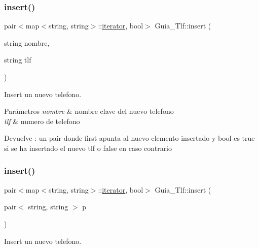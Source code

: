\subsubsection{\texorpdfstring{insert()}{insert()}\hspace{0.1cm}{\footnotesize\ttfamily [1/2]}}
{\footnotesize\ttfamily pair$<$map$<$string, string$>$\+::\hyperlink{classGuia__Tlf_1_1iterator}{iterator}, bool$>$ Guia\+\_\+\+Tlf\+::insert (\begin{DoxyParamCaption}\item[{string}]{nombre,  }\item[{string}]{tlf }\end{DoxyParamCaption})\hspace{0.3cm}{\ttfamily [inline]}}



Insert un nuevo telefono. 


\begin{DoxyParams}{Parámetros}
{\em nombre} & nombre clave del nuevo telefono \\
\hline
{\em tlf} & numero de telefono \\
\hline
\end{DoxyParams}
\begin{DoxyReturn}{Devuelve}
\+: un pair donde first apunta al nuevo elemento insertado y bool es true si se ha insertado el nuevo tlf o false en caso contrario 
\end{DoxyReturn}
\mbox{\label{classGuia__Tlf_a773d474972ea06ed8cf1bd031536bf82}} 
\subsubsection{\texorpdfstring{insert()}{insert()}\hspace{0.1cm}{\footnotesize\ttfamily [2/2]}}
{\footnotesize\ttfamily pair$<$map$<$string, string$>$\+::\hyperlink{classGuia__Tlf_1_1iterator}{iterator}, bool$>$ Guia\+\_\+\+Tlf\+::insert (\begin{DoxyParamCaption}\item[{pair$<$ string, string $>$}]{p }\end{DoxyParamCaption})\hspace{0.3cm}{\ttfamily [inline]}}



Insert un nuevo telefono. 


